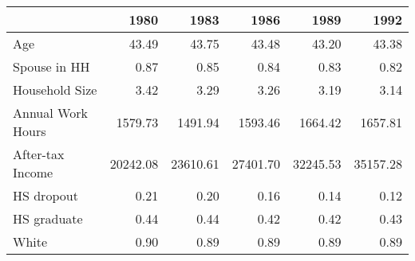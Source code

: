 \begin{tabular}{lrrrrr}
\toprule
{} &      1980 &      1983 &      1986 &      1989 &      1992 \\
\midrule
Age               &     43.49 &     43.75 &     43.48 &     43.20 &     43.38 \\
Spouse in HH      &      0.87 &      0.85 &      0.84 &      0.83 &      0.82 \\
Household Size    &      3.42 &      3.29 &      3.26 &      3.19 &      3.14 \\
Annual Work Hours &   1579.73 &   1491.94 &   1593.46 &   1664.42 &   1657.81 \\
After-tax Income  &  20242.08 &  23610.61 &  27401.70 &  32245.53 &  35157.28 \\
HS dropout        &      0.21 &      0.20 &      0.16 &      0.14 &      0.12 \\
HS graduate       &      0.44 &      0.44 &      0.42 &      0.42 &      0.43 \\
White             &      0.90 &      0.89 &      0.89 &      0.89 &      0.89 \\
\bottomrule
\end{tabular}
